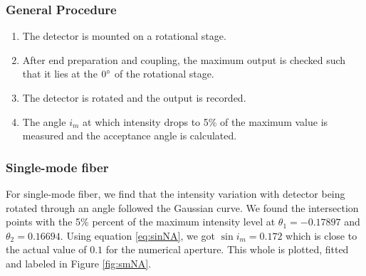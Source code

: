 \documentclass[%
 reprint,
nofootinbib,
 amsmath,amssymb,
 aps,
]{revtex4-2}
\begin{document}
\subsubsection*{\textbf{General Procedure}}
\begin{enumerate}
	\item The detector is mounted on a rotational stage.
	\item After end preparation and coupling, the maximum
	output is checked such that it lies at the $ 0 \degree $ of the rotational stage.
	\item The detector is rotated and the output is recorded.
	\item The angle $ i_m $ at which intensity drops to 5\% of the
	maximum value is measured and the acceptance angle is calculated.
\end{enumerate}

\subsubsection{Single-mode fiber}
For single-mode fiber, we find that the intensity variation with detector being rotated through an angle followed the Gaussian curve. We found the intersection points with the 5\% percent of the maximum intensity level at $ \theta_1 =  -0.17897$ and $ \theta_2 = 0.16694 $. Using equation \ref{eq:sinNA}, we got $ \sin i_m = 0.172 $ which is close to the actual value of $ 0.1 $ for the numerical aperture. This whole is plotted, fitted and labeled in Figure \ref{fig:smNA}.
\end{document}
